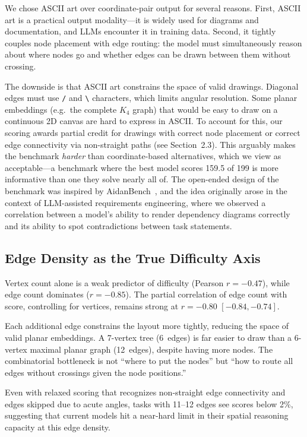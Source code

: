 \documentclass{article}
\begin{document}
We chose ASCII art over coordinate-pair output for several reasons. First, ASCII art is a practical output modality---it is widely used for diagrams and documentation, and LLMs encounter it in training data. Second, it tightly couples node placement with edge routing: the model must simultaneously reason about where nodes go and whether edges can be drawn between them without crossing.

The downside is that ASCII art constrains the space of valid drawings. Diagonal edges must use \texttt{/} and \texttt{\textbackslash} characters, which limits angular resolution. Some planar embeddings (e.g.\ the complete $K_4$ graph) that would be easy to draw on a continuous 2D canvas are hard to express in ASCII. To account for this, our scoring awards partial credit for drawings with correct node placement or correct edge connectivity via non-straight paths (see Section~2.3). This arguably makes the benchmark \emph{harder} than coordinate-based alternatives, which we view as acceptable---a benchmark where the best model scores 159.5 of 199 is more informative than one they solve nearly all of. The open-ended design of the benchmark was inspired by AidanBench~\citep{mclaughlin2025aidanbench}, and the idea originally arose in the context of LLM-assisted requirements engineering, where we observed a correlation between a model's ability to render dependency diagrams correctly and its ability to spot contradictions between task statements.

\subsection{Edge Density as the True Difficulty Axis}

Vertex count alone is a weak predictor of difficulty (Pearson $r = -0.47$), while edge count dominates ($r = -0.85$). The partial correlation of edge count with score, controlling for vertices, remains strong at $r = -0.80$ $[-0.84, -0.74]$.

Each additional edge constrains the layout more tightly, reducing the space of valid planar embeddings. A 7-vertex tree (6~edges) is far easier to draw than a 6-vertex maximal planar graph (12~edges), despite having more nodes. The combinatorial bottleneck is not ``where to put the nodes'' but ``how to route all edges without crossings given the node positions.''

Even with relaxed scoring that recognizes non-straight edge connectivity and edges skipped due to acute angles, tasks with 11--12 edges see scores below 2\%, suggesting that current models hit a near-hard limit in their spatial reasoning capacity at this edge density.
\end{document}
